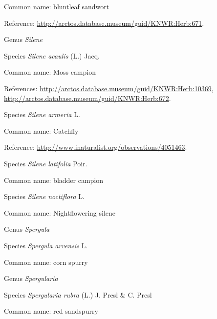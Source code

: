 \documentclass[9pt, article]{memoir}
\begin{document}
\begin{multicols}{2}
Common name: bluntleaf sandwort

Reference: 
\url{http://arctos.database.museum/guid/KNWR:Herb:671}.

\vspace{6pt}\noindent\hspace{30pt}Genus \textit{Silene}


\vspace{6pt}\noindent\hspace{36pt}Species \textit{Silene acaulis} (L.) Jacq.


Common name: Moss campion

References: 
\url{http://arctos.database.museum/guid/KNWR:Herb:10369}, 
\url{http://arctos.database.museum/guid/KNWR:Herb:672}.

\vspace{6pt}\noindent\hspace{36pt}Species \textit{Silene armeria} L.


Common name: Catchfly

Reference: 
\url{http://www.inaturalist.org/observations/4051463}.

\vspace{6pt}\noindent\hspace{36pt}Species \textit{Silene latifolia} Poir.


Common name: bladder campion

\vspace{6pt}\noindent\hspace{36pt}Species \textit{Silene noctiflora} L.


Common name: Nightflowering silene

\vspace{6pt}\noindent\hspace{30pt}Genus \textit{Spergula}


\vspace{6pt}\noindent\hspace{36pt}Species \textit{Spergula arvensis} L.


Common name: corn spurry

\vspace{6pt}\noindent\hspace{30pt}Genus \textit{Spergularia}


\vspace{6pt}\noindent\hspace{36pt}Species \textit{Spergularia rubra} (L.) J. Presl \& C. Presl


Common name: red sandspurry


\end{multicols}
\end{document}
